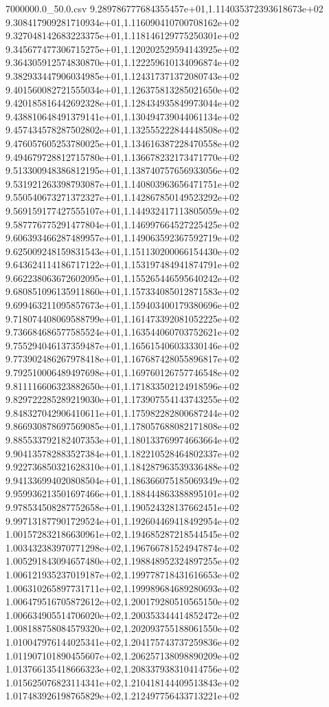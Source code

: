 \begin{filecontents*}{7000000.0_50.0.csv}
9.289786777684355457e+01,1.114035372393618673e+02
9.308417909281710934e+01,1.116090410700708162e+02
9.327048142683223375e+01,1.118146129775250301e+02
9.345677477306715275e+01,1.120202529594143925e+02
9.364305912574830870e+01,1.122259610134096874e+02
9.382933447906034985e+01,1.124317371372080743e+02
9.401560082721555034e+01,1.126375813285021650e+02
9.420185816442692328e+01,1.128434935849973044e+02
9.438810648491379141e+01,1.130494739044061134e+02
9.457434578287502802e+01,1.132555222844448508e+02
9.476057605253780025e+01,1.134616387228470558e+02
9.494679728812715780e+01,1.136678232173471770e+02
9.513300948386812195e+01,1.138740757656933056e+02
9.531921263398793087e+01,1.140803963656471751e+02
9.550540673271372327e+01,1.142867850149523292e+02
9.569159177427555107e+01,1.144932417113805059e+02
9.587776775291477804e+01,1.146997664527225425e+02
9.606393466287489957e+01,1.149063592367592719e+02
9.625009248159831543e+01,1.151130200066154430e+02
9.643624114186717122e+01,1.153197484941874791e+02
9.662238063672602095e+01,1.155265446595640242e+02
9.680851096135911860e+01,1.157334085012871583e+02
9.699463211095857673e+01,1.159403400179380696e+02
9.718074408069588799e+01,1.161473392081052225e+02
9.736684686577585524e+01,1.163544060703752621e+02
9.755294046137359487e+01,1.165615406033330146e+02
9.773902486267978418e+01,1.167687428055896817e+02
9.792510006489497698e+01,1.169760126757746548e+02
9.811116606323882650e+01,1.171833502124918596e+02
9.829722285289219030e+01,1.173907554143743255e+02
9.848327042906410611e+01,1.175982282800687244e+02
9.866930878697569085e+01,1.178057688082171808e+02
9.885533792182407353e+01,1.180133769974663664e+02
9.904135782883527384e+01,1.182210528464802337e+02
9.922736850321628310e+01,1.184287963539336488e+02
9.941336994020808504e+01,1.186366075185069349e+02
9.959936213501697466e+01,1.188444863388895101e+02
9.978534508287752658e+01,1.190524328137662451e+02
9.997131877901729524e+01,1.192604469418492954e+02
1.001572832186630961e+02,1.194685287218544545e+02
1.003432383970771298e+02,1.196766781524947874e+02
1.005291843094657480e+02,1.198848952324897255e+02
1.006121935237019187e+02,1.199778718431616653e+02
1.006310265897731711e+02,1.199989684689280693e+02
1.006479516705872612e+02,1.200179280510565150e+02
1.006634905514706020e+02,1.200353344414852472e+02
1.008188758084579320e+02,1.202093755188061550e+02
1.010047976144025341e+02,1.204175743737259836e+02
1.011907101890455607e+02,1.206257138098890209e+02
1.013766135418666323e+02,1.208337938310414756e+02
1.015625076823114341e+02,1.210418144409513843e+02
1.017483926198765829e+02,1.212497756433713221e+02

\end{filecontents*}
